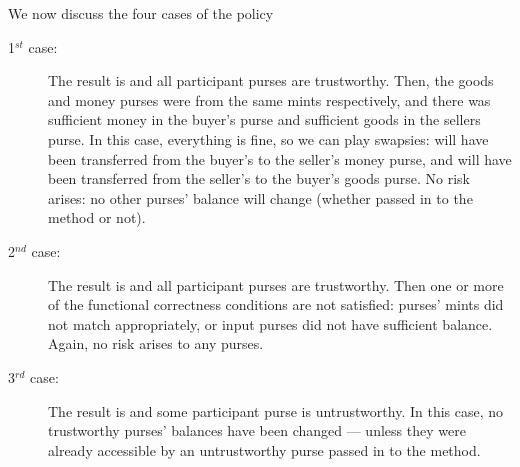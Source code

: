 We now discuss the four cases of the policy

   \vspace{-.2in}
\begin{description}

\item [1$^{st}$ case:] The result is  and all participant purses are trustworthy.
Then, the goods and money purses
  were from the same mints respectively, and there was sufficient
  money in the buyer's purse and sufficient goods in the sellers purse.
  In this case, everything is fine, so we can play swapsies:
   will have been transferred from the buyer's to the
  seller's money purse, and  will have been transferred from
  the seller's to the buyer's goods purse. %
  No risk arises: %
  no other
  purses' balance will change (whether passed in to
  the method or not).

  
\item [2$^{nd}$ case:] The result is  and all participant purses are trustworthy. Then
one or more of  the functional correctness conditions are
  not satisfied: purses' mints did not match appropriately, or input
  purses did not have sufficient balance. Again, no risk arises
  to any purses.


\item [3$^{rd}$ case:] The result is  and some participant purse is untrustworthy.
  In this case, no   trustworthy purses' balances have been changed --- unless
  they were already accessible by an untrustworthy purse passed in to
  the method. 


\end{description}
